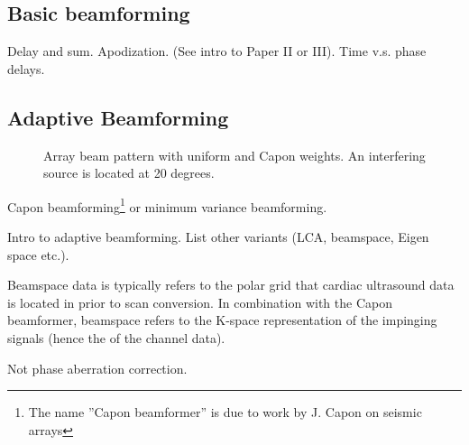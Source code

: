 \subsection{Basic beamforming}

Delay and sum. Apodization. (See intro to Paper II or III).
Time v.s. phase delays.

\subsection{Adaptive Beamforming}\label{sec:adaptbf}

\begin{figure}[t!]
\caption{Array beam pattern with uniform and Capon weights. An interfering source is located at 20 degrees.}
\end{figure}

Capon beamforming\footnote{The name ''Capon beamformer'' is due to work by J. Capon  on seismic arrays } or minimum variance beamforming.

Intro to adaptive beamforming. List other variants (LCA, beamspace, Eigen space etc.). 

Beamspace data is typically refers to the polar grid that cardiac ultrasound data is located in prior to scan conversion. In combination with the Capon beamformer, beamspace refers to the K-space representation of the impinging signals (hence the  of the channel data). 

Not phase aberration correction.

